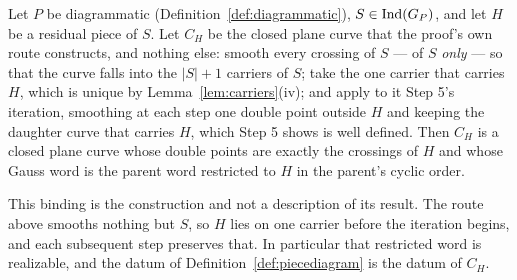 \begin{lemma}
\label{lem:piececurve}
Let $P$ be diagrammatic (Definition~\ref{def:diagrammatic}),
$S\in\operatorname{Ind}(G_P)$, and let $H$ be a residual piece of $S$. Let $C_H$ be the closed
plane curve that the proof's own route constructs, and nothing else: smooth
every crossing of $S$ --- of $S$ \emph{only} --- so that the curve falls into
the $|S|+1$ carriers of $S$; take the one carrier that carries $H$, which is
unique by Lemma~\ref{lem:carriers}(iv); and apply to it Step 5's iteration,
smoothing at each step one double point outside $H$ and keeping the daughter
curve that carries $H$, which Step 5 shows is well defined. Then $C_H$ is a
closed plane curve whose double points are exactly the crossings of $H$ and
whose Gauss word is the parent word restricted to $H$ in the parent's cyclic
order.

This binding is the construction and not a description of its result. The
route above smooths nothing but $S$, so $H$ lies on one carrier before the
iteration begins, and each subsequent step preserves that. In particular that restricted word is realizable, and the datum of
Definition~\ref{def:piecediagram} is the datum of $C_H$.
\end{lemma}
